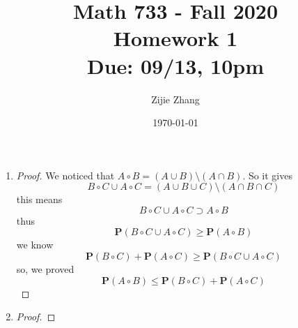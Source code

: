 \documentclass{article}
\title{Math 733 - Fall 2020\\
        {\Large \textbf{Homework 1}}\\
        {\normalsize \textbf{Due: 09/13, 10pm}}
    }
\author{Zijie Zhang}
\date{\today}
\begin{document}
    \maketitle
    \begin{enumerate}
        \item \begin{proof}
            We noticed that $A \circ B = (A \cup B) \setminus (A \cap B)$. So it
            gives
            $$B \circ C \cup A \circ C = (A \cup B \cup C) 
                \setminus (A \cap B \cap C)$$
            this means
            $$B \circ C \cup A \circ C \supset A \circ B$$
            thus
            $$\mathbf{P}(B \circ C \cup A \circ C) 
                \geqslant \mathbf{P}(A \circ B)$$
            we know
            $$\mathbf{P}(B \circ C) + \mathbf{P}(A \circ C)
                \geqslant \mathbf{P}(B \circ C \cup A \circ C)$$
            so, we proved
            $$\mathbf{P}(A \circ B) \leqslant
                \mathbf{P}(B \circ C) + \mathbf{P}(A \circ C)$$
        \end{proof}

        \item \begin{proof}
            
        \end{proof}
    \end{enumerate}
\end{document}
